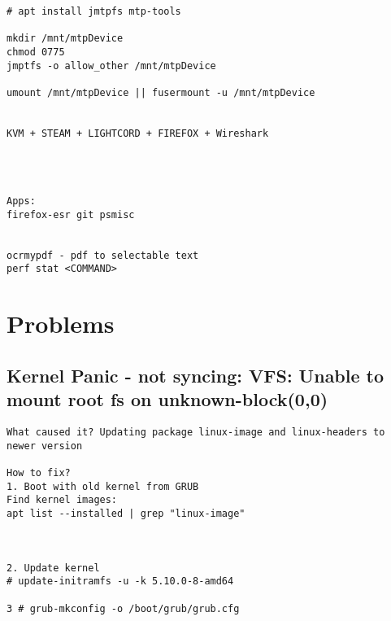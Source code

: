 \documentclass[10pt, a4paper, onecolumn, openany]{book} %
\begin{document}
\begin{Verbatim}[commandchars=\\\{\}]
# apt install jmtpfs mtp-tools

mkdir /mnt/mtpDevice
chmod 0775
jmptfs -o allow_other /mnt/mtpDevice

umount /mnt/mtpDevice || fusermount -u /mnt/mtpDevice


KVM + STEAM + LIGHTCORD + FIREFOX + Wireshark




Apps:
firefox-esr git psmisc


ocrmypdf - pdf to selectable text
perf stat <COMMAND>
\end{Verbatim}


\section{Problems}
\subsection{Kernel Panic - not syncing: VFS: Unable to mount root fs on unknown-block(0,0)}
\begin{Verbatim}[commandchars=\\\{\}]
What caused it? Updating package linux-image and linux-headers to newer version

How to fix? 
1. Boot with old kernel from GRUB
Find kernel images:
apt list --installed | grep "linux-image"



2. Update kernel
# update-initramfs -u -k 5.10.0-8-amd64

3 # grub-mkconfig -o /boot/grub/grub.cfg

\end{Verbatim}
\end{document}
